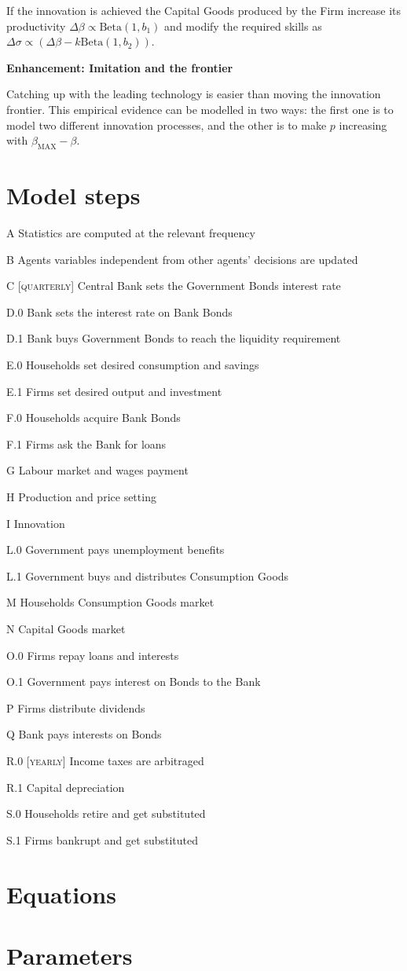 \documentclass[a4paper, headings=standardclasses]{scrartcl}
\newenvironment{enh}[1][]{\begin{framed}\noindent\textbf{Enhancement: #1}\par}{\end{framed}}
\begin{document}
If the innovation is achieved the Capital Goods produced by the Firm increase its productivity $\Delta \beta \propto \text{Beta}(1, b_1)$ and modify the required skills as $\Delta \sigma \propto (\Delta \beta - k \text{Beta}(1, b_2))$.

\begin{enh}[Imitation and the frontier]
	Catching up with the leading technology is easier than moving the innovation frontier. This empirical evidence can be modelled in two ways: the first one is to model two different innovation processes, and the other is to make $p$ increasing with $\beta_\text{MAX} - \beta$.
\end{enh}

\section{Model steps}
\begin{steps}
	\item[A] Statistics are computed at the relevant frequency
	\item[B] Agents variables independent from other agents' decisions are updated
	\item[C] [\textsc{quarterly}] Central Bank sets the Government Bonds interest rate
	\item[D.0] Bank sets the interest rate on Bank Bonds
	\item[D.1] Bank buys Government Bonds to reach the liquidity requirement
	\item[E.0] Households set desired consumption and savings
	\item[E.1] Firms set desired output and investment
	\item[F.0] Households acquire Bank Bonds
	\item[F.1] Firms ask the Bank for loans
	\item[G] Labour market and wages payment
	\item[H] Production and price setting
	\item[I] Innovation
	\item[L.0] Government pays unemployment benefits
	\item[L.1] Government buys and distributes Consumption Goods
	\item[M] Households Consumption Goods market
	\item[N] Capital Goods market
	\item[O.0] Firms repay loans and interests
	\item[O.1] Government pays interest on Bonds to the Bank
	\item[P] Firms distribute dividends
	\item[Q] Bank pays interests on Bonds
	\item[R.0] [\textsc{yearly}] Income taxes are arbitraged
	\item[R.1] Capital depreciation
	\item[S.0] Households retire and get substituted
	\item[S.1] Firms bankrupt and get substituted
\end{steps}

\section{Equations}

\section{Parameters}

\printbibliography
\end{document}
